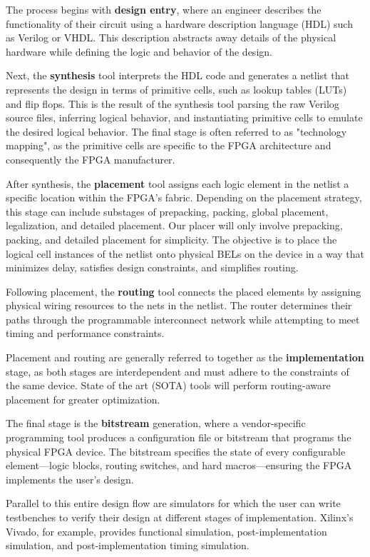 \documentclass[twocolumn]{article}
\begin{document}
    The process begins with \textbf{design entry}, where an engineer describes the functionality of their circuit using a hardware description language (HDL) such as Verilog or VHDL. This description abstracts away details of the physical hardware while defining the logic and behavior of the design.

    Next, the \textbf{synthesis} tool interprets the HDL code and generates a netlist that represents the design in terms of primitive cells, such as lookup tables (LUTs) and flip flops. 
    This is the result of the synthesis tool parsing the raw Verilog source files, inferring logical behavior, and instantiating primitive cells to emulate the desired logical behavior. 
    The final stage is often referred to as "technology mapping", as the primitive cells are specific to the FPGA architecture and consequently the FPGA manufacturer. 

    After synthesis, the \textbf{placement} tool assigns each logic element in the netlist a specific location within the FPGA’s fabric. 
    Depending on the placement strategy, this stage can include substages of prepacking, packing, global placement, legalization, and detailed placement. 
    Our placer will only involve prepacking, packing, and detailed placement for simplicity. 
    The objective is to place the logical cell instances of the netlist onto physical BELs on the device in a way that minimizes delay, satisfies design constraints, and simplifies routing. 

    Following placement, the \textbf{routing} tool connects the placed elements by assigning physical wiring resources to the nets in the netlist. 
    The router determines their paths through the programmable interconnect network while attempting to meet timing and performance constraints.

    Placement and routing are generally referred to together as the \textbf{implementation} stage, as both stages are interdependent and must adhere to the constraints of the same device. 
    State of the art (SOTA) tools will perform routing-aware placement for greater optimization. 

    The final stage is the \textbf{bitstream} generation, where a vendor-specific programming tool produces a configuration file or bitstream that programs the physical FPGA device. 
    The bitstream specifies the state of every configurable element—logic blocks, routing switches, and hard macros—ensuring the FPGA implements the user's design. 


    Parallel to this entire design flow are simulators for which the user can write testbenches to verify their design at different stages of implementation.
    Xilinx's Vivado, for example, provides functional simulation, post-implementation simulation, and post-implementation timing simulation.
\end{document}
